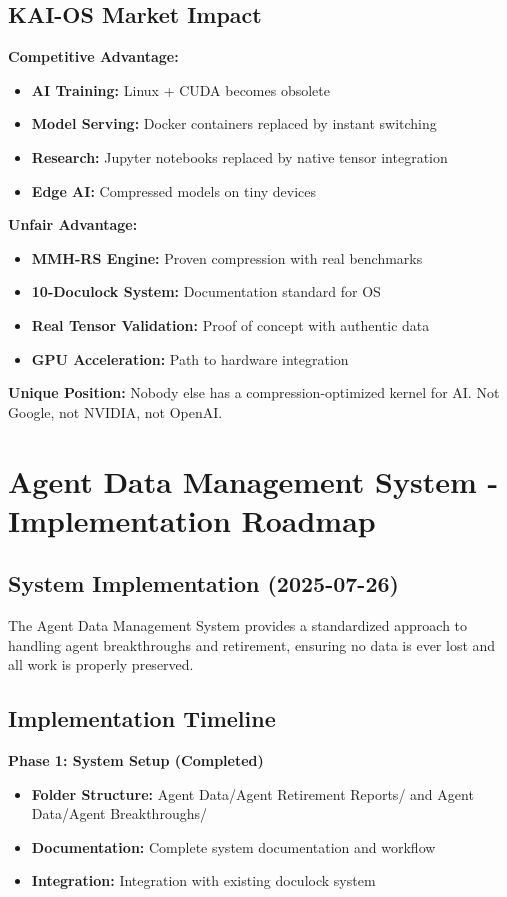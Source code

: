 \documentclass[12pt,a4paper]{article}
\begin{document}
\subsection{KAI-OS Market Impact}

\textbf{Competitive Advantage:}
\begin{itemize}
    \item \textbf{AI Training:} Linux + CUDA becomes obsolete
    \item \textbf{Model Serving:} Docker containers replaced by instant switching
    \item \textbf{Research:} Jupyter notebooks replaced by native tensor integration
    \item \textbf{Edge AI:} Compressed models on tiny devices
\end{itemize}

\textbf{Unfair Advantage:}
\begin{itemize}
    \item \textbf{MMH-RS Engine:} Proven compression with real benchmarks
    \item \textbf{10-Doculock System:} Documentation standard for OS
    \item \textbf{Real Tensor Validation:} Proof of concept with authentic data
    \item \textbf{GPU Acceleration:} Path to hardware integration
\end{itemize}

\textbf{Unique Position:} Nobody else has a compression-optimized kernel for AI. Not Google, not NVIDIA, not OpenAI.

\section{Agent Data Management System - Implementation Roadmap}

\subsection{System Implementation (2025-07-26)}
The Agent Data Management System provides a standardized approach to handling agent breakthroughs and retirement, ensuring no data is ever lost and all work is properly preserved.

\subsection{Implementation Timeline}
\textbf{Phase 1: System Setup (Completed)}
\begin{itemize}
    \item \textbf{Folder Structure:} Agent Data/Agent Retirement Reports/ and Agent Data/Agent Breakthroughs/
    \item \textbf{Documentation:} Complete system documentation and workflow
    \item \textbf{Integration:} Integration with existing doculock system
\end{itemize}
\end{document}
